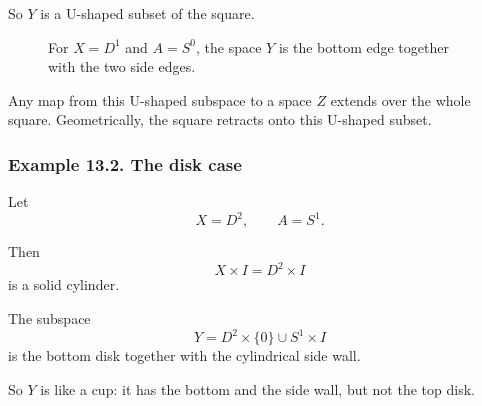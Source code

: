 \documentclass[12pt,a4paper]{article}
\theoremstyle{notespace}
\begin{document}
So \(Y\) is a U-shaped subset of the square.

\begin{figure}[htbp]
	\centering
	\caption{For \(X=D^1\) and \(A=S^0\), the space \(Y\) is the bottom edge together with the two side edges.}
\end{figure}

Any map from this U-shaped subspace to a space \(Z\) extends over the whole square. Geometrically, the square retracts onto this U-shaped subset.

\subsubsection*{Example 13.2. The disk case}

Let
\[
X=D^2,
\qquad
A=S^1.
\]

Then
\[
X\times I=D^2\times I
\]
is a solid cylinder.

The subspace
\[
Y=D^2\times\{0\}\cup S^1\times I
\]
is the bottom disk together with the cylindrical side wall.

So \(Y\) is like a cup: it has the bottom and the side wall, but not the top disk.
\end{document}
